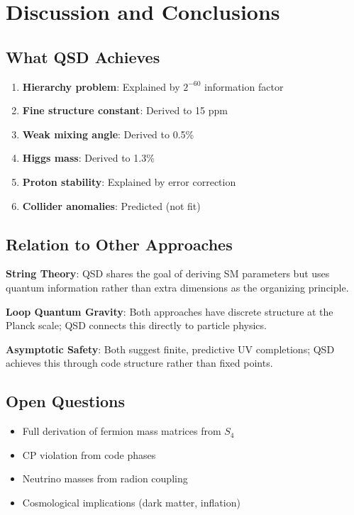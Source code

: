 \documentclass[11pt,a4paper]{article}
\theoremstyle{definition}
\begin{document}
\section{Discussion and Conclusions}
\label{sec:discussion}

\subsection{What QSD Achieves}

\begin{enumerate}[nosep]
    \item \textbf{Hierarchy problem}: Explained by $2^{-60}$ information factor
    \item \textbf{Fine structure constant}: Derived to 15 ppm
    \item \textbf{Weak mixing angle}: Derived to 0.5\%
    \item \textbf{Higgs mass}: Derived to 1.3\%
    \item \textbf{Proton stability}: Explained by error correction
    \item \textbf{Collider anomalies}: Predicted (not fit)
\end{enumerate}

\subsection{Relation to Other Approaches}

\textbf{String Theory}: QSD shares the goal of deriving SM parameters but uses quantum information rather than extra dimensions as the organizing principle.

\textbf{Loop Quantum Gravity}: Both approaches have discrete structure at the Planck scale; QSD connects this directly to particle physics.

\textbf{Asymptotic Safety}: Both suggest finite, predictive UV completions; QSD achieves this through code structure rather than fixed points.

\subsection{Open Questions}

\begin{itemize}[nosep]
    \item Full derivation of fermion mass matrices from $S_4$
    \item CP violation from code phases
    \item Neutrino masses from radion coupling
    \item Cosmological implications (dark matter, inflation)
\end{itemize}
\end{document}
